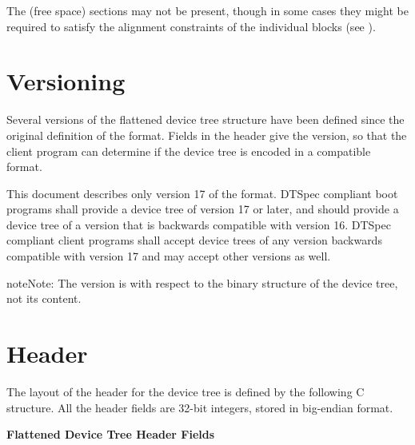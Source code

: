 \documentclass[a4paper,10pt,oneside]{sphinxmanual}
\begin{document}
The (free space) sections may not be present, though in some cases they
might be required to satisfy the alignment constraints of the individual
blocks (see {\hyperref[flattened\string-format:sect\string-fdt\string-alignment]{}}).


\section{Versioning}
\label{flattened-format:sect-fdt-versioning}\label{flattened-format:versioning}
Several versions of the flattened device tree structure have been defined since
the original definition of the format. Fields in the header give the version,
so that the client program can determine if the device tree is encoded in a
compatible format.

This document describes only version 17 of the format. DTSpec compliant boot
programs shall provide a device tree of version 17 or later, and should provide
a device tree of a version that is backwards compatible with version 16.
DTSpec compliant client programs shall accept device trees of any version
backwards compatible with version 17 and may accept other versions as well.

\begin{notice}{note}{Note:}
The version is with respect to the binary structure of the device
tree, not its content.
\end{notice}


\section{Header}
\label{flattened-format:sect-fdt-header}\label{flattened-format:header}
The layout of the header for the device tree is defined by the following
C structure. All the header fields are 32-bit integers, stored in
big-endian format.

\textbf{Flattened Device Tree Header Fields}
\end{document}
